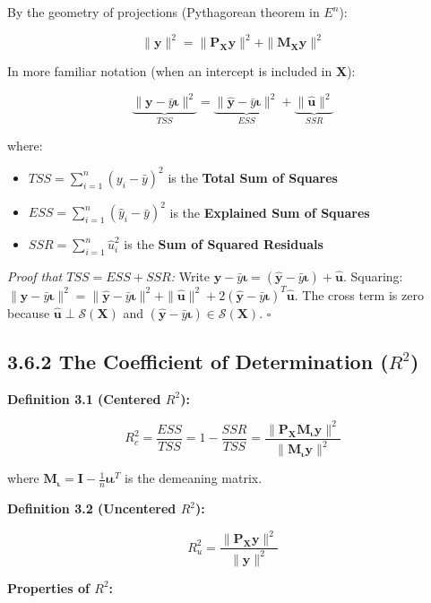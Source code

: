 By the geometry of projections (Pythagorean theorem in $E^n$):

\[
\|\mathbf{y}\|^2 = \|\mathbf{P_X}\mathbf{y}\|^2 + \|\mathbf{M_X}\mathbf{y}\|^2
\]

In more familiar notation (when an intercept is included in $\mathbf{X}$):

\[
\underbrace{\|\mathbf{y} - \bar{y}\boldsymbol{\iota}\|^2}_{TSS} = \underbrace{\|\hat{\mathbf{y}} - \bar{y}\boldsymbol{\iota}\|^2}_{ESS} + \underbrace{\|\hat{\mathbf{u}}\|^2}_{SSR}
\]

where:
\begin{itemize}
\item $TSS = \sum_{i=1}^n (y_i - \bar{y})^2$ is the \textbf{Total Sum of Squares}
\item $ESS = \sum_{i=1}^n (\hat{y}_i - \bar{y})^2$ is the \textbf{Explained Sum of Squares}
\item $SSR = \sum_{i=1}^n \hat{u}_i^2$ is the \textbf{Sum of Squared Residuals}
\end{itemize}

\textit{Proof that $TSS = ESS + SSR$:} Write $\mathbf{y} - \bar{y}\boldsymbol{\iota} = (\hat{\mathbf{y}} - \bar{y}\boldsymbol{\iota}) + \hat{\mathbf{u}}$. Squaring: $\|\mathbf{y} - \bar{y}\boldsymbol{\iota}\|^2 = \|\hat{\mathbf{y}} - \bar{y}\boldsymbol{\iota}\|^2 + \|\hat{\mathbf{u}}\|^2 + 2(\hat{\mathbf{y}} - \bar{y}\boldsymbol{\iota})^T\hat{\mathbf{u}}$. The cross term is zero because $\hat{\mathbf{u}} \perp \mathcal{S}(\mathbf{X})$ and $(\hat{\mathbf{y}} - \bar{y}\boldsymbol{\iota}) \in \mathcal{S}(\mathbf{X})$. $\square$

\subsection{3.6.2 The Coefficient of Determination ($R^2$)}

\textbf{Definition 3.1 (Centered $R^2$):}

\[
R_c^2 = \frac{ESS}{TSS} = 1 - \frac{SSR}{TSS} = \frac{\|\mathbf{P_X}\mathbf{M_\iota}\mathbf{y}\|^2}{\|\mathbf{M_\iota}\mathbf{y}\|^2}
\]

where $\mathbf{M_\iota} = \mathbf{I} - \frac{1}{n}\boldsymbol{\iota}\boldsymbol{\iota}^T$ is the demeaning matrix.

\textbf{Definition 3.2 (Uncentered $R^2$):}

\[
R_u^2 = \frac{\|\mathbf{P_X}\mathbf{y}\|^2}{\|\mathbf{y}\|^2}
\]

\textbf{Properties of $R^2$:}

